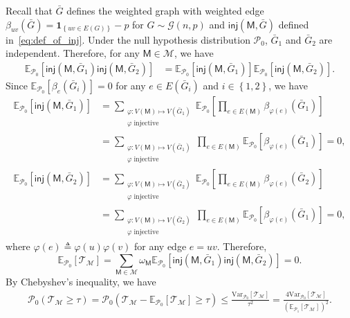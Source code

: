 \documentclass[letterpaper,11pt]{article}
\theoremstyle{definition}
\newcommand{\maG}{\mathcal{G}}
\newcommand{\maM}{\mathcal{M}}
\newcommand{\maP}{\mathcal{P}}
\newcommand{\maT}{\mathcal{T}}
\newcommand{\pth}[1]{\left( #1 \right)}
\newcommand{\qth}[1]{\left[ #1 \right]}
\newcommand{\sth}[1]{\left\{ #1 \right\}}
\newcommand{\sfM}{{\mathsf{M}}}
\newcommand{\indc}[1]{{\mathbf{1}_{\left\{{#1}\right\}}}}
\newcommand{\inj}{\mathsf{inj}}
\def\var{\mathrm{Var}}
\def\E{\mathbb{E}}
\begin{document}
Recall that $\bar{G}$ defines the weighted graph with weighted edge $\beta_{uv}(\bar{G}) = \indc{uv\in E(G)} - p$ for $G\sim \maG(n,p)$ and $\inj(\sfM,\bar{G})$ defined in~\eqref{eq:def_of_inj}. Under the null hypothesis distribution $\maP_0$, $\bar{G}_1$ and $\bar{G}_2$ are independent. Therefore, for any $\sfM\in \maM$, we have \begin{align*}
    \mathbb{E}_{\maP_0} \qth{\inj(\sfM,\bar{G}_1) \inj(\sfM,\bar{G}_2)} &= \mathbb{E}_{\maP_0}\qth{\inj(\sfM,\bar{G}_1)} \mathbb{E}_{\maP_0}\qth{\inj(\sfM,\bar{G}_2)}. 
\end{align*}
    Since $\mathbb{E}_{\maP_0}\qth{\beta_e(\bar{G}_i)} = 0$ for any $e\in E(\bar{G}_i)$ and $i\in \sth{1,2}$, we have \begin{align*}
\mathbb{E}_{\maP_0}\qth{\inj(\sfM,\bar{G}_1)} &= \sum_{\substack{\varphi:V(\sfM)\mapsto V(\bar{G}_1)\\\varphi\text{ injective}}} \mathbb{E}_{\maP_0}\qth{\prod_{e\in E(\sfM)} \beta_{\varphi(e)}(\bar{G}_1)}\\&=\sum_{\substack{\varphi:V(\sfM)\mapsto V(\bar{G}_1)\\\varphi\text{ injective}}}\prod_{e\in E(\sfM)} \mathbb{E}_{\maP_0}\qth{\beta_{ \varphi(e)}(\bar{G}_1)}=0,\\
\mathbb{E}_{\maP_0}\qth{\inj(\sfM,\bar{G}_2)} &= \sum_{\substack{\varphi:V(\sfM)\mapsto V(\bar{G}_2)\\\varphi\text{ injective}}} \mathbb{E}_{\maP_0}\qth{\prod_{e\in E(\sfM)} \beta_{\varphi(e)}(\bar{G}_2)}\\&=\sum_{\substack{\varphi:V(\sfM)\mapsto V(\bar{G}_2)\\\varphi\text{ injective}}}\prod_{e\in E(\sfM)} \mathbb{E}_{\maP_0}\qth{\beta_{ \varphi(e)}(\bar{G}_1)}=0,
    \end{align*}
    where $\varphi(e)\triangleq \varphi(u)\varphi(v)$ for any edge $e=uv$. Therefore, $$\mathbb{E}_{\maP_0}\qth{\maT_{\maM}}=\sum_{\sfM\in \maM} \omega_\sfM\mathbb{E}_{\maP_0}\qth{\inj(\sfM,\bar{G}_1) \inj(\sfM,\bar{G}_2)}=0.$$ 
By Chebyshev's inequality, we have \begin{align}\label{eq:typeI-chebyshev}
  {\maP_0}\pth{\maT_{\maM}\ge \tau}= {\maP_0}\pth{\maT_{\maM}-\mathbb{E}_{\maP_0}\qth{\maT_{\maM}}\ge \tau }\le \frac{\var_{\maP_0}\qth{\maT_{\maM}}}{\tau^2}=\frac{4\var_{\maP_0}\qth{\maT_{\maM}}}{\pth{\E_{\maP_1}\qth{\maT_{\maM}}}^2}.
    \end{align}
\end{document}
